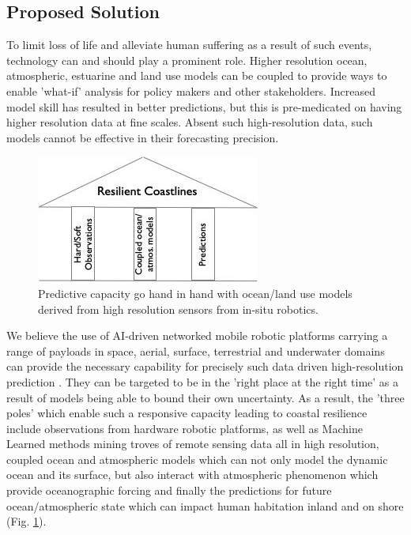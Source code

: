 \subsection*{Proposed Solution}

To limit loss of life and alleviate human suffering as a result of
such events, technology can and should play a prominent role. Higher
resolution ocean, atmospheric, estuarine and land use models can be
coupled to provide ways to enable 'what-if' analysis for policy makers
and other stakeholders. Increased model skill has resulted in better
predictions, but this is pre-medicated on having higher resolution
data at fine scales. Absent such high-resolution data, such models
cannot be effective in their forecasting precision. 

\begin{figure}
  \centering
  \includegraphics[scale=0.5]{fig/trioka.jpg}
  \caption{Predictive capacity go hand in hand with ocean/land use
    models derived from high resolution sensors from in-situ robotics.}
  \label{fig:tri}
\end{figure}

We believe the use of AI-driven networked mobile robotic platforms
carrying a range of payloads in space, aerial, surface, terrestrial
and underwater domains can provide the necessary capability for
precisely such data driven high-resolution prediction . They
can be targeted to be in the 'right place at the right time' as a
result of models being able to bound their own uncertainty. As a
result, the 'three poles' which enable such a responsive capacity
leading to coastal resilience include observations from hardware
robotic platforms, as well as Machine Learned methods mining troves of
remote sensing data all in high resolution, coupled ocean and
atmospheric models which can not only model the dynamic ocean and its
surface, but also interact with atmospheric phenomenon which provide
oceanographic forcing and finally the predictions for future
ocean/atmospheric state which can impact human habitation inland and
on shore (Fig. \ref{fig:tri}).


